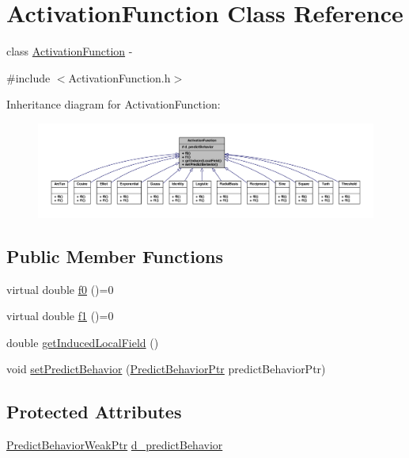 \hypertarget{class_activation_function}{
\section{ActivationFunction Class Reference}
\label{class_activation_function}
}


class \hyperlink{class_activation_function}{ActivationFunction} -\/  




{\ttfamily \#include $<$ActivationFunction.h$>$}



Inheritance diagram for ActivationFunction:
\nopagebreak
\begin{figure}[H]
\begin{center}
\leavevmode
\includegraphics[width=400pt]{class_activation_function__inherit__graph}
\end{center}
\end{figure}
\subsection*{Public Member Functions}
\begin{DoxyCompactItemize}
\item 
virtual double \hyperlink{class_activation_function_a801deb6a372121fe110de1f79f93f1c6}{f0} ()=0
\item 
virtual double \hyperlink{class_activation_function_aa5a0a713bc1080ab5d5ae3632a08b08e}{f1} ()=0
\item 
double \hyperlink{class_activation_function_a72f5e70051e79c0e19318ba1b9bb77ec}{getInducedLocalField} ()
\item 
void \hyperlink{class_activation_function_a8570d6dfe9d0859c6bfb921a752e3703}{setPredictBehavior} (\hyperlink{_a_m_o_r_e_8h_a1fb2f1f8fdf1e08c42ef4bdce436af93}{PredictBehaviorPtr} predictBehaviorPtr)
\end{DoxyCompactItemize}
\subsection*{Protected Attributes}
\begin{DoxyCompactItemize}
\item 
\hyperlink{_a_m_o_r_e_8h_ae02ab8473cf61b61b3b9c154dc01191a}{PredictBehaviorWeakPtr} \hyperlink{class_activation_function_a0540673abfbcf1d2f2adfcde4051b483}{d\_\-predictBehavior}
\end{DoxyCompactItemize}


